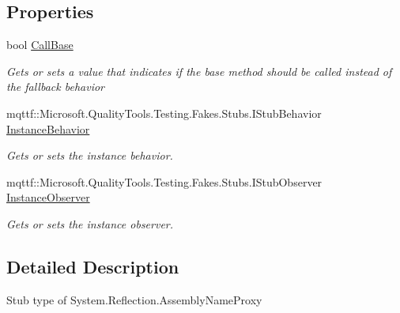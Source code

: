 \subsection*{Properties}
\begin{DoxyCompactItemize}
\item 
bool \hyperlink{class_system_1_1_reflection_1_1_fakes_1_1_stub_assembly_name_proxy_a54e7949c20740fa2003b144ca8adf4d5}{Call\-Base}
\begin{DoxyCompactList}\small\item\em Gets or sets a value that indicates if the base method should be called instead of the fallback behavior\end{DoxyCompactList}\item 
mqttf\-::\-Microsoft.\-Quality\-Tools.\-Testing.\-Fakes.\-Stubs.\-I\-Stub\-Behavior \hyperlink{class_system_1_1_reflection_1_1_fakes_1_1_stub_assembly_name_proxy_aa2cbe5bd7ecc9a5a54c007411a770aef}{Instance\-Behavior}
\begin{DoxyCompactList}\small\item\em Gets or sets the instance behavior.\end{DoxyCompactList}\item 
mqttf\-::\-Microsoft.\-Quality\-Tools.\-Testing.\-Fakes.\-Stubs.\-I\-Stub\-Observer \hyperlink{class_system_1_1_reflection_1_1_fakes_1_1_stub_assembly_name_proxy_a6d9bf564b08e51c79ea7afebfe2c260d}{Instance\-Observer}
\begin{DoxyCompactList}\small\item\em Gets or sets the instance observer.\end{DoxyCompactList}\end{DoxyCompactItemize}


\subsection{Detailed Description}
Stub type of System.\-Reflection.\-Assembly\-Name\-Proxy



